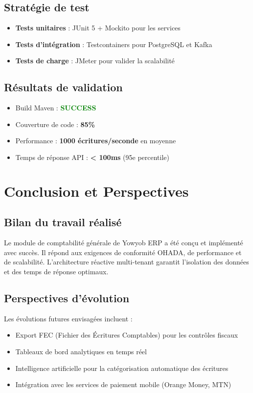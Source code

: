 \documentclass[12pt]{report}
\begin{document}
\section{Stratégie de test}
\begin{itemize}
    \item \textbf{Tests unitaires} : JUnit 5 + Mockito pour les services
    \item \textbf{Tests d'intégration} : Testcontainers pour PostgreSQL et Kafka
    \item \textbf{Tests de charge} : JMeter pour valider la scalabilité
\end{itemize}

\section{Résultats de validation}
\begin{tcolorbox}[colframe=green, colback=green!10, boxrule=2pt, arc=6pt, title={Résultats des tests}, coltitle=black]
\begin{itemize}
    \item Build Maven : \textcolor{green}{\textbf{SUCCESS}}
    \item Couverture de code : \textbf{85\%}
    \item Performance : \textbf{1000 écritures/seconde} en moyenne
    \item Temps de réponse API : \textbf{< 100ms} (95e percentile)
\end{itemize}
\end{tcolorbox}

\chapter{Conclusion et Perspectives}

\section{Bilan du travail réalisé}
Le module de comptabilité générale de Yowyob ERP a été conçu et implémenté avec succès. Il répond aux exigences de conformité OHADA, de performance et de scalabilité. L'architecture réactive multi-tenant garantit l'isolation des données et des temps de réponse optimaux.

\section{Perspectives d'évolution}
Les évolutions futures envisagées incluent :
\begin{itemize}
    \item Export FEC (Fichier des Écritures Comptables) pour les contrôles fiscaux
    \item Tableaux de bord analytiques en temps réel
    \item Intelligence artificielle pour la catégorisation automatique des écritures
    \item Intégration avec les services de paiement mobile (Orange Money, MTN)
\end{itemize}
\end{document}
